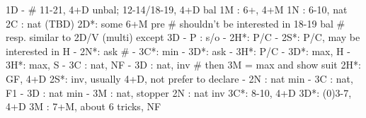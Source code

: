 1D -  # 11-21, 4+D unbal; 12-14/18-19, 4+D bal
1M : 6+, 4+M
1N : 6-10, nat
2C : nat (TBD)
2D*: some 6+M pre  # shouldn't be interested in 18-19 bal
   # resp. similar to 2D/V (multi) except 3D
   - P  : s/o
   - 2H*: P/C
   - 2S*: P/C, may be interested in H
   - 2N*: ask  # 
        - 3C*: min
             - 3D*: ask
             - 3H*: P/C
        - 3D*: max, H
        - 3H*: max, S
   - 3C : nat, NF
   - 3D : nat, inv  # then 3M = max and show suit
2H*: GF, 4+D
2S*: inv, usually 4+D, not prefer to declare
   - 2N : nat min
   - 3C : nat, F1
   - 3D : nat min
   - 3M : nat, stopper
2N : nat inv
3C*: 8-10, 4+D
3D*: (0)3-7, 4+D
3M : 7+M, about 6 tricks, NF